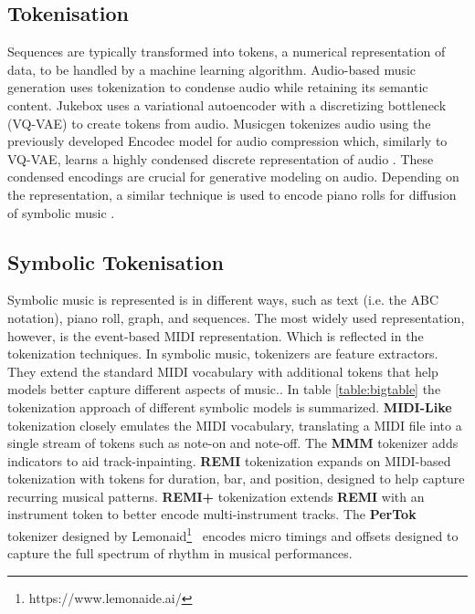 \subsection{Tokenisation}\label{section:tokenization}
Sequences are typically transformed into tokens, a numerical representation of data, to be handled by a machine learning algorithm. Audio-based music generation uses tokenization to condense audio while retaining its semantic content. Jukebox \cite{Dhariwal_Jun_Payne_Kim_Radford_Sutskever_2020} uses a variational autoencoder\cite{Kingma_Welling_2014} with a discretizing bottleneck (VQ-VAE) to create tokens from audio. Musicgen \cite{copet2023simple} tokenizes audio using the previously developed Encodec model for audio compression which, similarly to VQ-VAE, learns a highly condensed discrete representation of audio \cite{Défossez_2023_encodec}. These condensed encodings are crucial for generative modeling on audio. Depending on the representation, a similar technique is used to encode piano rolls for diffusion of symbolic music \cite{Min_Jiang_Xia_Zhao_polyffusion_2023}\cite{Zhu_Liu_Jiang_Zheng_texture_2024}.

\subsection{Symbolic Tokenisation} \label{section:symbolic_tok}
Symbolic music is represented is in different ways, such as text (i.e. the ABC notation), piano roll, graph, and sequences. The most widely used representation, however, is the event-based MIDI representation. Which is reflected in the tokenization techniques. In symbolic music, tokenizers are feature extractors. They extend the standard MIDI vocabulary with additional tokens that help models better capture different aspects of music.\cite{Fradet_Briot_Chhel_2021}. In table \ref{table:bigtable} the tokenization approach of different symbolic models is summarized. \textbf{MIDI-Like} tokenization closely emulates the MIDI vocabulary, translating a MIDI file into a single stream of tokens such as note-on and note-off. The \textbf{MMM} tokenizer adds indicators to aid track-inpainting. \textbf{REMI} \cite{Huang_Yang_remi_pop_transformer_2020} tokenization expands on MIDI-based tokenization with tokens for duration, bar, and position, designed to help capture recurring musical patterns. \textbf{REMI+} \cite{Rütte_figaro_2023} tokenization extends \textbf{REMI} with an instrument token to better encode multi-instrument tracks. The \textbf{PerTok} tokenizer designed by Lemonaid\footnote{https://www.lemonaide.ai/}  encodes micro timings and offsets designed to capture the full spectrum of rhythm in musical performances.\\

